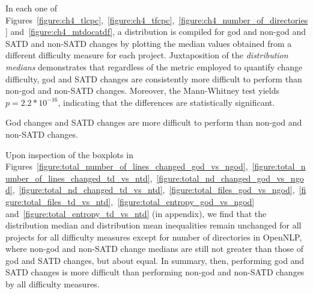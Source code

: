 {%

In each one of Figures~\ref{figure:ch4_tlcpc},~\ref{figure:ch4_tfcpc},~\ref{figure:ch4_number_of_directories} and~\ref{figure:ch4_mtdocatdf}, a distribution is compiled for god and non-god and SATD and non-SATD changes by plotting the median values obtained from a different difficulty measure for each project. Juxtaposition of the \textit{distribution medians} demonstrates that regardless of the metric employed to quantify change difficulty, god and SATD changes are consistently more difficult to perform than non-god and non-SATD changes. Moreover, the Mann-Whitney test \cite{mann1947test} yields $p=2.2\ast 10^{-16}$, indicating that the differences are statistically significant.\\

\begin{myboxii}
	God changes and SATD changes are more difficult to perform than non-god and non-SATD changes.
\end{myboxii}

Upon inspection of the boxplots in Figures~\ref{figure:total_number_of_lines_changed_god_vs_ngod},~\ref{figure:total_number_of_lines_changed_td_vs_ntd},~\ref{figure:total_nd_changed_god_vs_ngod},~\ref{figure:total_nd_changed_td_vs_ntd},~\ref{figure:total_files_god_vs_ngod},~\ref{figure:total_files_td_vs_ntd},~\ref{figure:total_entropy_god_vs_ngod} and~\ref{figure:total_entropy_td_vs_ntd} \revision (in appendix), we find that the distribution median and distribution mean inequalities remain unchanged for all projects for all difficulty measures except for number of directories in OpenNLP, where non-god and non-SATD change medians are still not greater than those of god and SATD changes, but about equal. In summary, then, performing god and SATD changes is more difficult than performing non-god and non-SATD changes by all difficulty measures.


\subsection*{\chapterIVrqIV}



}
